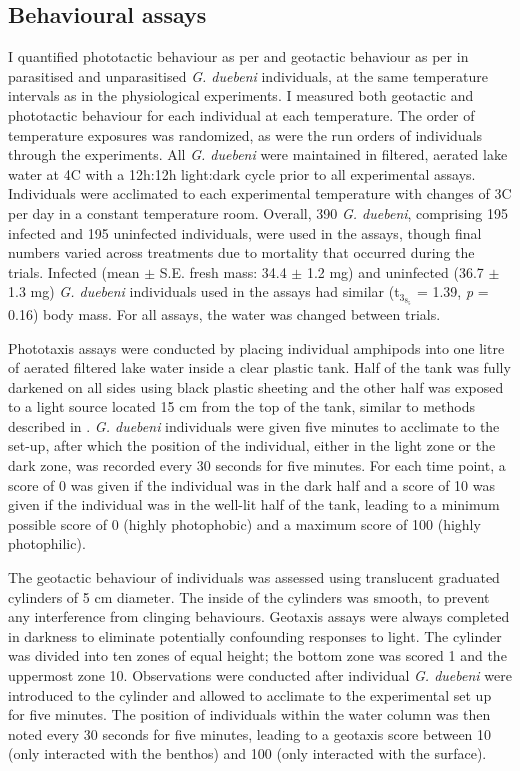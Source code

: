 \subsection{Behavioural assays}
I quantified phototactic behaviour as per \citet{perrot2004} and geotactic behaviour as per \citet{bauer2005} in parasitised and unparasitised \emph{G. duebeni} individuals, at the same temperature intervals as in the physiological experiments. I measured both geotactic and phototactic behaviour for each individual at each temperature. The order of temperature exposures was randomized, as were the run orders of individuals through the experiments. All \emph{G. duebeni} were maintained in filtered, aerated lake water at 4\degree C with a 12h:12h light:dark cycle prior to all experimental assays. Individuals were acclimated to each experimental temperature with changes of 3\degree C per day in a constant temperature room. Overall, 390 \emph{G. duebeni}, comprising 195 infected and 195 uninfected individuals, were used in the assays, though final numbers varied across treatments due to mortality that occurred during the trials. Infected (mean $\pm$ S.E. fresh mass: 34.4 $\pm$ 1.2 mg) and uninfected (36.7 $\pm$ 1.3 mg) \emph{G. duebeni} individuals used in the assays had similar (t$_3_8_5$ = 1.39, \emph{p} = 0.16) body mass. For all assays, the water was changed between trials. 

Phototaxis assays were conducted by placing individual amphipods into one litre of aerated filtered lake water inside a clear plastic tank. Half of the tank was fully darkened on all sides using black plastic sheeting and the other half was exposed to a light source located 15 cm from the top of the tank, similar to methods described in \citet{perrot2004}. \emph{G. duebeni} individuals were given five minutes to acclimate to the set-up, after which the position of the individual, either in the light zone or the dark zone, was recorded every 30 seconds for five minutes. For each time point, a score of 0 was given if the individual was in the dark half and a score of 10 was given if the individual was in the well-lit half of the tank, leading to a minimum possible score of 0 (highly photophobic) and a maximum score of 100 (highly photophilic).  	

The geotactic behaviour of individuals was assessed using translucent graduated cylinders of 5 cm diameter. The inside of the cylinders was smooth, to prevent any interference from clinging behaviours. Geotaxis assays were always completed in darkness to eliminate potentially confounding responses to light. The cylinder was divided into ten zones of equal height; the bottom zone was scored 1 and the uppermost zone 10. Observations were conducted after individual \emph{G. duebeni} were introduced to the cylinder and allowed to acclimate to the experimental set up for five minutes. The position of individuals within the water column was then noted every 30 seconds for five minutes, leading to a geotaxis score between 10 (only interacted with the benthos) and 100 (only interacted with the surface).  

